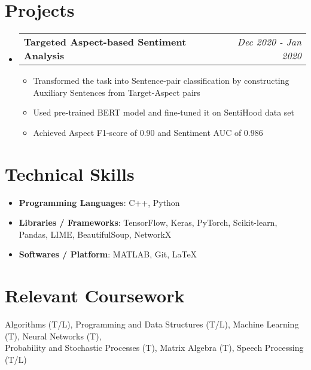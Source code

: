 \documentclass[a4,10pt]{article}
\makeatletter
\newcommand{\resumeItem}[2]{
  \item{
    \textbf{#1}{: #2 \vspace{-2pt}}
  }
}
\newcommand{\resumeSubheadingTwo}[2]{
  \vspace{-1pt}\item
    \begin{tabular*}{0.97\textwidth}{l@{\extracolsep{\fill}}r}
      \textbf{#1} & #2
    \end{tabular*}\vspace{-5pt}
}
\newcommand{\resumeSubItem}[2]{\resumeItem{#1}{#2}\vspace{-4pt}}
\newcommand{\resumeSubHeadingListStart}{\begin{itemize}[leftmargin=*]}
\newcommand{\resumeSubHeadingListEnd}{\end{itemize}}
\makeatother
\begin{document}
\section{Projects}
  \resumeSubHeadingListStart
  
    \resumeSubheadingTwo
      {Targeted Aspect-based Sentiment Analysis \href{https://github.com/utkarsh512/ABSA-Bert}{\faGithub}}{\textit{Dec 2020 - Jan 2020}}
      \begin{itemize}[leftmargin=*]
          \itemsep-0.15em
          \item {Transformed the task into Sentence-pair classification by constructing Auxiliary Sentences from Target-Aspect pairs}
          \item {Used pre-trained BERT model and fine-tuned it on SentiHood data set}
          \item {Achieved Aspect F1-score of 0.90 and Sentiment AUC of 0.986}
      \end{itemize}

  \resumeSubHeadingListEnd
  
\section{Technical Skills}
  \resumeSubHeadingListStart
    \resumeSubItem{Programming Languages}
      {C++, Python}
    \resumeSubItem{Libraries / Frameworks}
      {TensorFlow, Keras, PyTorch, Scikit-learn, Pandas, LIME, BeautifulSoup, NetworkX}
    \resumeSubItem{Softwares / Platform}
      {MATLAB, Git, \LaTeX}
  \resumeSubHeadingListEnd
  
\section{Relevant Coursework}
\begin{changemargin}{0.35cm}{0cm} 
{Algorithms (T/L), Programming and Data Structures (T/L), Machine Learning (T), Neural Networks (T), \\Probability and Stochastic Processes (T), Matrix Algebra (T), Speech Processing (T/L)}  
\end{changemargin}
\end{document}
